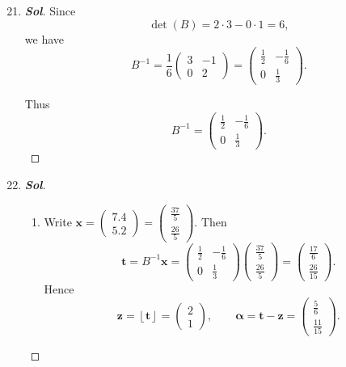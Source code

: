 \begin{enumerate}
	\setcounter{enumi}{20}
	\item \begin{proof}[\normalfont\color{magenta}\bfseries Sol]
	Since
	\[
	\det(B)=2\cdot 3-0\cdot 1=6,
	\]
	we have
	\[
	B^{-1}
	=
	\frac1{6}
	\begin{pmatrix}
		3&-1\\
		0&2
	\end{pmatrix}
	=
	\begin{pmatrix}
		\frac12&-\frac16\\[4pt]
		0&\frac13
	\end{pmatrix}.
	\]
	
	Thus
	\[
	\boxed{
		B^{-1}
		=
		\begin{pmatrix}
			\frac12&-\frac16\\[4pt]
			0&\frac13
		\end{pmatrix}.
	}
	\]
	\end{proof}
	\item \begin{proof}[\normalfont\color{magenta}\bfseries Sol]
	\begin{enumerate}
		\item Write $
		\mathbf x=\begin{pmatrix}
			7.4 \\ 5.2
		\end{pmatrix}=\begin{pmatrix}\frac{37}{5}\\ \frac{26}{5}\end{pmatrix}$.
		Then
		\[
		\mathbf t
		=
		B^{-1}\mathbf x
		=
		\begin{pmatrix}
			\frac12&-\frac16\\[4pt]
			0&\frac13
		\end{pmatrix}
		\begin{pmatrix}\frac{37}{5}\\ \frac{26}{5}\end{pmatrix}
		=
		\begin{pmatrix}\frac{17}{6}\\ \frac{26}{15}\end{pmatrix}.
		\]
		Hence
		\[
		\mathbf z=\left\lfloor \mathbf t\right\rfloor
		=
		\begin{pmatrix}2 \\ 1\end{pmatrix},
		\qquad
		\boldsymbol\alpha
		=
		\mathbf t-\mathbf z
		=
		\begin{pmatrix}\frac56 \\ \frac{11}{15}\end{pmatrix}.
\]
\end{enumerate}
\end{proof}
\end{enumerate}
